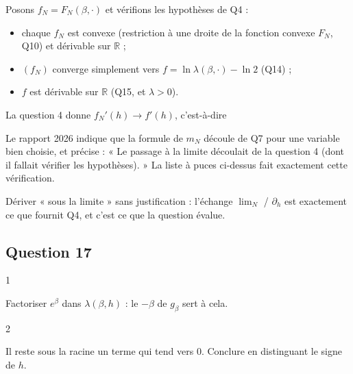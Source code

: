 \documentclass[11pt,a4paper]{article}
\providecommand{\tightlist}{\setlength{\itemsep}{0pt}\setlength{\parskip}{0pt}}
\newcommand{\equationajustee}[1]{%
  \sbox{\boiteequation}{$\displaystyle #1$}%
  \ifdim\wd\boiteequation>\linewidth
    \[\resizebox{\linewidth}{!}{\usebox{\boiteequation}}\]%
  \else
    \[#1\]%
  \fi}
\begin{document}
Posons \(f_N=F_N(\beta,\cdot)\) et vérifions les hypothèses de Q4 :

\begin{itemize}
\tightlist
\item
  chaque \(f_N\) est convexe (restriction à une droite de la fonction convexe \(F_N\), Q10) et dérivable sur \(\mathbb R\) ;
\item
  \((f_N)\) converge simplement vers \(f=\ln\lambda(\beta,\cdot)-\ln2\) (Q14) ;
\item
  \(f\) est dérivable sur \(\mathbb R\) (Q15, et \(\lambda>0\)).
\end{itemize}

La question 4 donne \(f_N'(h)\to f'(h)\), c'est-à-dire
\equationajustee{\boxed{\lim_{N\to+\infty}m_N(\beta,h)=\frac{\partial}{\partial h}\ln\lambda(\beta,h)}}

\begin{jury}

Le rapport 2026 indique que la formule de \(m_N\) découle de Q7 pour une variable bien choisie, et précise : « Le passage à la limite découlait de la question 4 (dont il fallait vérifier les hypothèses). » La liste à puces ci-dessus fait exactement cette vérification.

\end{jury}

\begin{piege}

Dériver « sous la limite » sans justification : l'échange \(\lim_N\) / \(\partial_h\) est exactement ce que fournit Q4, et c'est ce que la question évalue.

\end{piege}

\hypertarget{question-17}{%
\subsection{Question 17}\label{question-17}}

\begin{indication}{1}

Factoriser \(e^\beta\) dans \(\lambda(\beta,h)\) : le \(-\beta\) de \(g_\beta\) sert à cela.

\end{indication}

\begin{indication}{2}

Il reste sous la racine un terme qui tend vers \(0\). Conclure en distinguant le signe de \(h\).

\end{indication}
\end{document}
